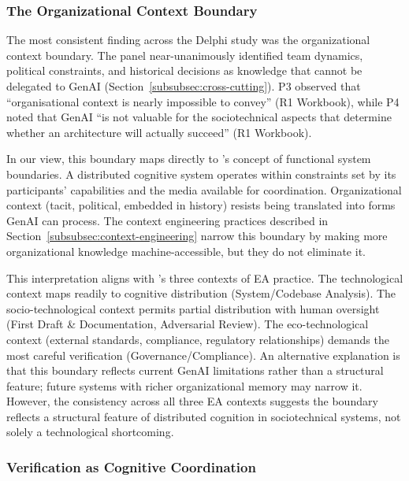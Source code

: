 \subsubsection{The Organizational Context Boundary}

The most consistent finding across the Delphi study was the organizational
context boundary. The panel near-unanimously identified team dynamics,
political constraints, and historical decisions as knowledge that cannot be
delegated to GenAI (Section~\ref{subsubsec:cross-cutting}). P3 observed that
``organisational context is nearly impossible to convey'' (R1 Workbook), while
P4 noted that GenAI ``is not valuable for the sociotechnical aspects that
determine whether an architecture will actually succeed'' (R1 Workbook).

In our view, this boundary maps directly to
\textcite{hutchins_cognition_1995}'s concept of functional system boundaries.
A distributed cognitive system operates within constraints set by its
participants' capabilities and the media available for coordination.
Organizational context (tacit, political, embedded in history) resists being
translated into forms GenAI can process. The context engineering practices described in
Section~\ref{subsubsec:context-engineering} narrow this boundary by making more
organizational knowledge machine-accessible, but they do not eliminate it.

This interpretation aligns with \textcite{saint-louis_investigation_2019}'s
three contexts of EA practice. The technological context maps readily to
cognitive distribution (System/Codebase Analysis). The socio-technological
context permits partial distribution with human oversight (First Draft \&
Documentation, Adversarial Review). The eco-technological context (external
standards, compliance, regulatory relationships) demands the most careful
verification (Governance/Compliance). An alternative explanation is that this boundary reflects current GenAI
limitations rather than a structural feature; future systems with richer
organizational memory may narrow it. However, the consistency across
all three EA contexts suggests the boundary reflects a structural
feature of distributed cognition in sociotechnical systems, not solely a
technological shortcoming.

\subsubsection{Verification as Cognitive Coordination}

